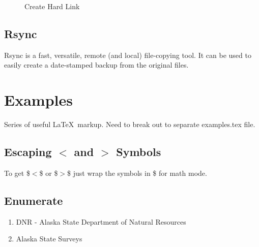 \documentclass[12pt,letterpaper,dvips]{article}
\newcommand{\cmd}[1]{\texttt{#1}}
\newenvironment{itemize*}%
  {\begin{itemize}%
    \setlength{\itemsep}{0pt}%
    \setlength{\parsep}{0pt}}%
  {\end{itemize}}
\begin{document}
\begin{figure}
\begin{center}
\framebox{
\begin{minipage}[t]{0.10\textwidth}
\begin{center}
\cmd{cp -al}
\end{center}
\end{minipage}
}
\caption{Create Hard Link}
\label{fig:create_hard_link}
\end{center}
\end{figure}

\subsection{Rsync}
Rsync is a fast, versatile, remote (and local) file-copying tool.  It can be used to easily create 
a date-stamped backup from the original files.



\newpage
\section{Examples}
Series of useful \LaTeX\ markup. Need to break out to 
separate examples.tex file.

\subsection{Escaping $<$ and $>$ Symbols}
To get \$$<$\$ or \$$>$\$ just wrap the symbols in \$ for math mode.

\subsection{Enumerate}
\begin{enumerate}
  \item{DNR} - Alaska State Department of Natural Resources

  \item{Alaska State Surveys}
\end{enumerate}
\end{document}
